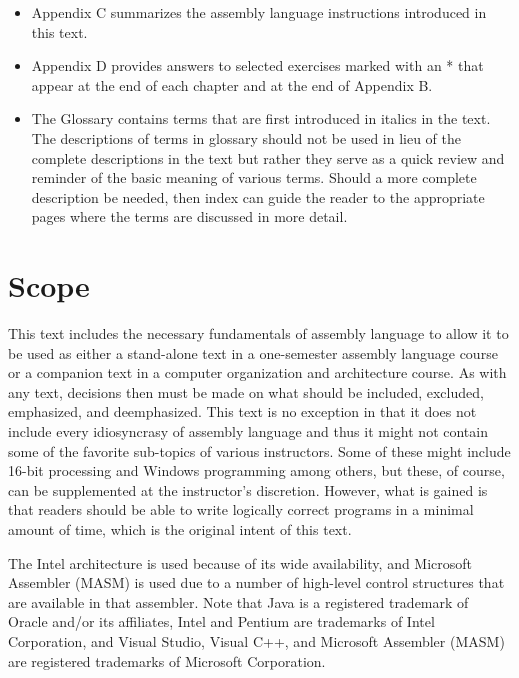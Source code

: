 \documentclass[10pt]{book}
\begin{document}
\begin{itemize}
  \item Appendix C summarizes the assembly language instructions introduced in this text.
  \item Appendix D provides answers to selected exercises marked with an * that appear at the end of each chapter and at the end of Appendix B.
  \item The Glossary contains terms that are first introduced in italics in the text. The descriptions of terms in glossary should not be used in lieu of the complete descriptions in the text but rather they serve as a quick review and reminder of the basic meaning of various terms. Should a more complete description be needed, then index can guide the reader to the appropriate pages where the terms are discussed in more detail.
\end{itemize}


\section{Scope}
This text includes the necessary fundamentals of assembly language to allow it to be used as either a stand-alone text in a one-semester assembly language course or a companion text in a computer organization and architecture course. As with any text, decisions then must be made on what should be included, excluded, emphasized, and deemphasized. This text is no exception in that it does not include every idiosyncrasy of assembly language and thus it might not contain some of the favorite sub-topics of various instructors. Some of these might include 16-bit processing and Windows programming among others, but these, of course, can be supplemented at the instructor's discretion. However, what is gained is that readers should be able to write logically correct programs in a minimal amount of time, which is the original intent of this text.


The Intel architecture is used because of its wide availability, and Microsoft Assembler (MASM) is used due to a number of high-level control structures that are available in that assembler. Note that Java is a registered trademark of Oracle and/or its affiliates, Intel and Pentium are trademarks of Intel Corporation, and Visual Studio, Visual C++, and Microsoft Assembler (MASM) are registered trademarks of Microsoft Corporation.
\end{document}
